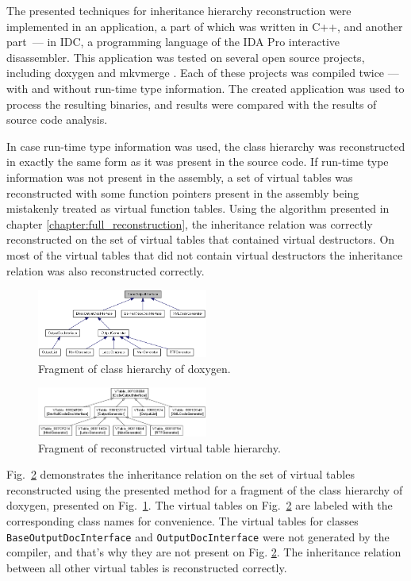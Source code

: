 \documentclass[times, 10pt,twocolumn]{article}
\begin{document}
The presented techniques for inheritance hierarchy reconstruction
were implemented in an application,
a part of which was written in C++, and another part~--- in IDC,
a programming language of the IDA Pro interactive disassembler.
This application was tested on several open source projects,
including doxygen  \cite{doxygen} \fi
and mkvmerge  \cite{mkvtoolnix} \fi.
Each of these projects was compiled twice --- with and without
run-time type information.
The created application was used to process the resulting binaries,
and results were compared with the results of source code analysis.

In case run-time type information was used,
the class hierarchy was reconstructed in exactly the same form
as it was present in the source code.
If run-time type information was not present in the assembly,
a set of virtual tables was reconstructed with some function pointers present
in the assembly being mistakenly treated as virtual function tables.
Using the algorithm presented in chapter \ref{chapter:full_reconstruction},
the inheritance relation was correctly reconstructed
on the set of virtual tables that contained virtual destructors.
On most of the virtual tables that did not contain virtual destructors
the inheritance relation was also reconstructed correctly.

\begin{figure}[htb!]
\centering
\includegraphics[width=0.5\textwidth]{images/doxy_objtree_doxy}
\caption{Fragment of class hierarchy of doxygen.}
\label{fig:objtree_doxy}
\end{figure}

\begin{figure}[htb!]
\centering
\includegraphics[width=0.5\textwidth]{images/doxy_objtree_nortti_label}
\caption{Fragment of reconstructed virtual table hierarchy.}
\label{fig:objtree_our}
\end{figure}

Fig.~\ref{fig:objtree_our} demonstrates the inheritance relation
on the set of virtual tables reconstructed using the presented method
for a fragment of the class hierarchy of doxygen,
presented on Fig.~\ref{fig:objtree_doxy}.
The virtual tables on Fig.~\ref{fig:objtree_our}
are labeled with the corresponding class names for convenience.
The virtual tables for classes \lstinline{BaseOutputDocInterface}
and \lstinline{OutputDocInterface} were not generated by the compiler,
and that's why they are not present on Fig. \ref{fig:objtree_our}.
The inheritance relation between all other virtual tables
is reconstructed correctly.
\end{document}
